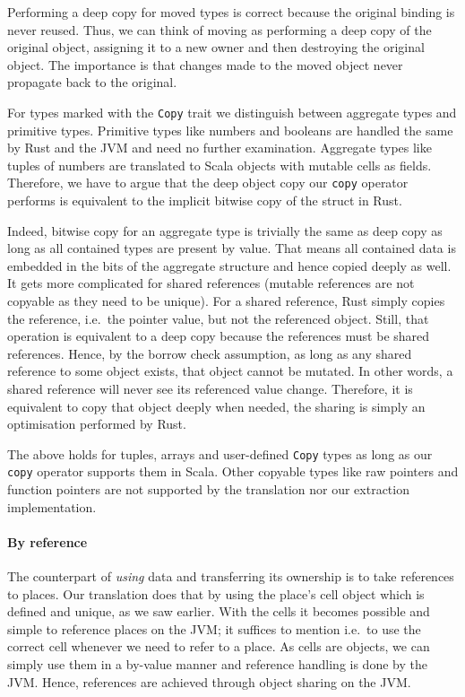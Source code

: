 Performing a deep copy for moved types is correct because the original
binding is never reused. Thus, we can think of moving as performing a
deep copy of the original object, assigning it to a new owner and then
destroying the original object. The importance is that changes made to
the moved object never propagate back to the original.

For types marked with the \passthrough{\lstinline!Copy!} trait we
distinguish between aggregate types and primitive types. Primitive types
like numbers and booleans are handled the same by Rust and the JVM and
need no further examination. Aggregate types like tuples of numbers are
translated to Scala objects with mutable cells as fields. Therefore, we
have to argue that the deep object copy our
\passthrough{\lstinline!copy!} operator performs is equivalent to the
implicit bitwise copy of the struct in Rust.

Indeed, bitwise copy for an aggregate type is trivially the same as deep
copy as long as all contained types are present by value. That means all
contained data is embedded in the bits of the aggregate structure and
hence copied deeply as well. It gets more complicated for shared
references (mutable references are not copyable as they need to be
unique). For a shared reference, Rust simply copies the reference,
i.e.~the pointer value, but not the referenced object. Still, that
operation is equivalent to a deep copy because the references must be
shared references. Hence, by the borrow check assumption, as long as any
shared reference to some object exists, that object cannot be mutated.
In other words, a shared reference will never see its referenced value
change. Therefore, it is equivalent to copy that object deeply when
needed, the sharing is simply an optimisation performed by Rust.

The above holds for tuples, arrays and user-defined
\passthrough{\lstinline!Copy!} types as long as our
\passthrough{\lstinline!copy!} operator supports them in Scala. Other
copyable types like raw pointers and function pointers are not supported
by the translation nor our extraction implementation.

\paragraph{By reference}

The counterpart of \emph{using} data and transferring its ownership is
to take references to places. Our translation does that by using the
place's cell object which is defined and unique, as we saw earlier. With
the cells it becomes possible and simple to reference places on the JVM;
it suffices to mention i.e.~to use the correct cell whenever we need to
refer to a place. As cells are objects, we can simply use them in a
by-value manner and reference handling is done by the JVM. Hence,
references are achieved through object sharing on the JVM.

